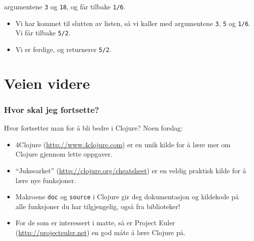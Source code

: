\documentclass{beamer}
\begin{document}
\begin{frame}[fragile, t]
\begin{overprint}
\begin{itemize}
      argumentene {\tt 3} og {\tt 18}, og får tilbake {\tt 1/6}.
    \end{itemize}
    \begin{semiverbatim}
    \end{semiverbatim}
    \begin{itemize}
    \item<16-> Vi har kommet til slutten av listen, så vi kaller {\tt *} med
      argumentene {\tt 3}, {\tt 5} og {\tt 1/6}. Vi får tilbake {\tt 5/2}.
    \item<17-> Vi er ferdige, og returnerer {\tt 5/2}.
    \end{itemize}
  \end{overprint}

\end{frame}

\section{Veien videre}

\begin{frame}
  \frametitle{Hvor skal jeg fortsette?}
  Hvor fortsetter man for å bli bedre i Clojure? Noen forslag:
  \begin{itemize}
  \item<+-> 4Clojure (\url{http://www.4clojure.com}) er en unik kilde for å
    lære mer om Clojure gjennom lette oppgaver.
  \item<+-> ``Juksearket'' (\url{http://clojure.org/cheatsheet}) er en veldig
    praktisk kilde for å lære nye funksjoner.
  \item<+-> Makroene {\tt doc} og {\tt source} i Clojure gir deg dokumentasjon
    og kildekode på alle funksjoner du har tilgjengelig, også fra biblioteker!
  \item<+-> For de som er interessert i matte, så er Project Euler
    (\url{http://projecteuler.net}) en god måte å lære Clojure på.
  \end{itemize}
\end{frame}
\end{document}
